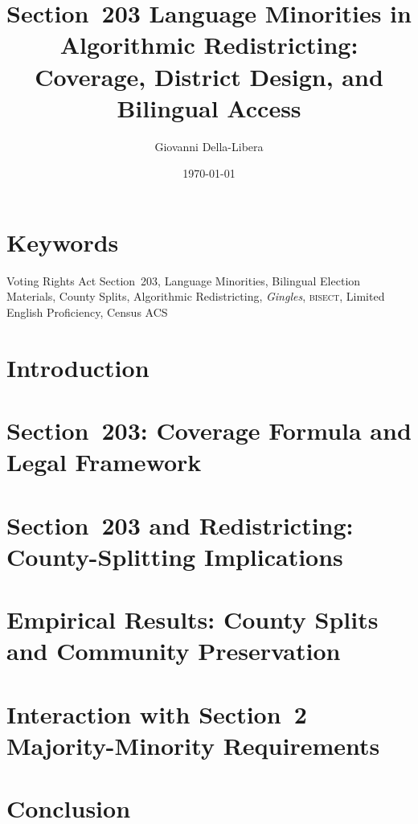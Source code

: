 \documentclass[12pt]{article}
\title{\textbf{Section~203 Language Minorities in Algorithmic Redistricting:\\
Coverage, District Design, and Bilingual Access}}
\author{Giovanni Della-Libera}
\date{\today}
\begin{document}
\maketitle

\begin{abstract}

\end{abstract}

\section*{Keywords}
Voting Rights Act Section~203, Language Minorities, Bilingual Election Materials,
County Splits, Algorithmic Redistricting, \textit{Gingles}, \textsc{bisect},
Limited English Proficiency, Census ACS

\section{Introduction}


\section{Section~203: Coverage Formula and Legal Framework}


\section{Section~203 and Redistricting: County-Splitting Implications}


\section{Empirical Results: County Splits and Community Preservation}


\section{Interaction with Section~2 Majority-Minority Requirements}


\section{Conclusion}




\end{document}
